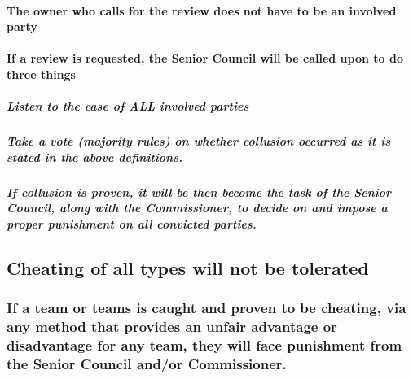 \documentclass[
]{book}
\begin{document}
\hypertarget{the-owner-who-calls-for-the-review-does-not-have-to-be-an-involved-party}{%
\paragraph{The owner who calls for the review does not have to be an involved party}\label{the-owner-who-calls-for-the-review-does-not-have-to-be-an-involved-party}}

\hypertarget{if-a-review-is-requested-the-senior-council-will-be-called-upon-to-do-three-things}{%
\paragraph{If a review is requested, the Senior Council will be called upon to do three things}\label{if-a-review-is-requested-the-senior-council-will-be-called-upon-to-do-three-things}}

\hypertarget{listen-to-the-case-of-all-involved-parties}{%
\subparagraph{Listen to the case of ALL involved parties}\label{listen-to-the-case-of-all-involved-parties}}

\hypertarget{take-a-vote-majority-rules-on-whether-collusion-occurred-as-it-is-stated-in-the-above-definitions.}{%
\subparagraph{Take a vote (majority rules) on whether collusion occurred as it is stated in the above definitions.}\label{take-a-vote-majority-rules-on-whether-collusion-occurred-as-it-is-stated-in-the-above-definitions.}}

\hypertarget{if-collusion-is-proven-it-will-be-then-become-the-task-of-the-senior-council-along-with-the-commissioner-to-decide-on-and-impose-a-proper-punishment-on-all-convicted-parties.}{%
\subparagraph{If collusion is proven, it will be then become the task of the Senior Council, along with the Commissioner, to decide on and impose a proper punishment on all convicted parties.}\label{if-collusion-is-proven-it-will-be-then-become-the-task-of-the-senior-council-along-with-the-commissioner-to-decide-on-and-impose-a-proper-punishment-on-all-convicted-parties.}}

\hypertarget{cheating-of-all-types-will-not-be-tolerated}{%
\subsection{Cheating of all types will not be tolerated}\label{cheating-of-all-types-will-not-be-tolerated}}

\hypertarget{if-a-team-or-teams-is-caught-and-proven-to-be-cheating-via-any-method-that-provides-an-unfair-advantage-or-disadvantage-for-any-team-they-will-face-punishment-from-the-senior-council-andor-commissioner.}{%
\subsubsection{If a team or teams is caught and proven to be cheating, via any method that provides an unfair advantage or disadvantage for any team, they will face punishment from the Senior Council and/or Commissioner.}\label{if-a-team-or-teams-is-caught-and-proven-to-be-cheating-via-any-method-that-provides-an-unfair-advantage-or-disadvantage-for-any-team-they-will-face-punishment-from-the-senior-council-andor-commissioner.}}
\end{document}
